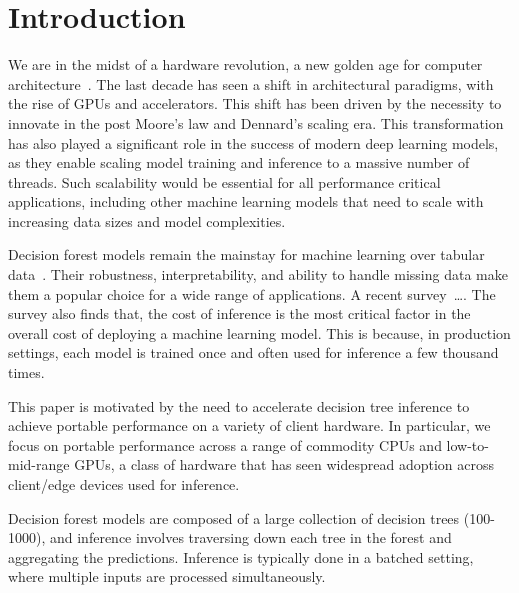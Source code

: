 \section{Introduction}
\label{sec:intro}
We are in the midst of a hardware revolution, a new golden age for computer architecture~\cite{GoldenAge}. The last 
decade has seen a shift in architectural paradigms, with the rise of GPUs and accelerators. This shift has been driven
by the necessity to innovate in the post Moore's law and Dennard's scaling era. This transformation has also played 
a significant role in the success of modern deep learning models, as they enable scaling model training and inference 
to a massive number of threads. Such scalability would be essential for all performance critical applications, including
other machine learning models that need to scale with increasing data sizes and model complexities. 

Decision forest models remain the mainstay for machine learning over tabular data~\cite{DLNotAllYouNeed,TreebasedOutperformDL}. 
Their robustness, interpretability, and ability to handle missing data make them a popular choice for a wide range of applications. 
A recent survey~\cite{kaggle}\dots. 
The survey also finds that, the cost of inference is the most critical factor in the overall cost of deploying a machine learning model.
This is because, in production settings, each model is trained once and often used for inference a few thousand times. 
%

This paper is motivated by the need to accelerate decision tree inference to achieve portable performance on a variety of client hardware.
In particular, we focus on portable performance across a range of commodity CPUs and low-to-mid-range GPUs, a class of hardware that has seen widespread adoption across client/edge devices used for inference.

Decision forest models are composed of a large collection of decision trees (100-1000), and inference involves traversing down each tree in the forest and aggregating the predictions. Inference is typically done in a batched setting, where multiple inputs are processed simultaneously.

